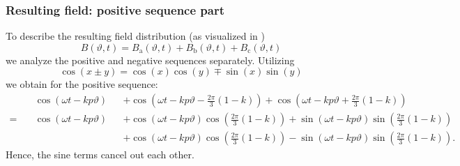 \begin{frame}
	\frametitle{Resulting field: positive sequence part}
    To describe the resulting field distribution (as visualized in ) 
    \begin{equation}
        B(\vartheta, t) = B_\mathrm{a}(\vartheta, t) + B_\mathrm{b}(\vartheta, t) + B_\mathrm{c}(\vartheta, t)
    \end{equation}
    we analyze the positive and negative sequences separately. Utilizing $$\cos(x \pm y) = \cos(x)\cos(y) \mp \sin(x)\sin(y)$$ we obtain for the positive sequence:
    \begin{equation*}
        \begin{alignedat}{2}
        &\cos(\omega t - k p \vartheta) &&+ \cos(\omega t - k p \vartheta - \frac{2\pi}{3}(1-k)) + \cos(\omega t - k p \vartheta + \frac{2\pi}{3}(1-k))\\
         = \quad &\cos(\omega t - k p \vartheta) &&+ \cos(\omega t - k p \vartheta) \cos(\frac{2\pi}{3}(1-k)) + \sin(\omega t - k p \vartheta) \sin(\frac{2\pi}{3}(1-k))\\
         & &&+ \cos(\omega t - k p \vartheta) \cos(\frac{2\pi}{3}(1-k)) - \sin(\omega t - k p \vartheta)\sin(\frac{2\pi}{3}(1-k)).   
        \end{alignedat}
    \end{equation*}
    Hence, the sine terms cancel out each other.
\end{frame}


